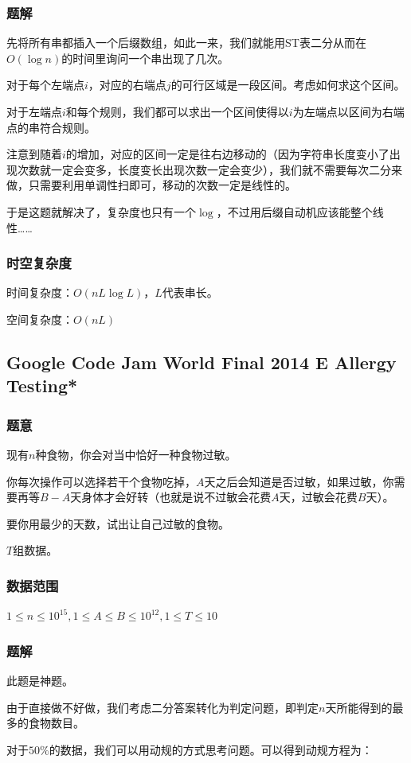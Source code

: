 \documentclass{ctexart}
\begin{document}
\subsubsection{题解}
先将所有串都插入一个后缀数组，如此一来，我们就能用ST表二分从而在$O(\log n)$的时间里询问一个串出现了几次。

对于每个左端点$i$，对应的右端点$j$的可行区域是一段区间。考虑如何求这个区间。

对于左端点$i$和每个规则，我们都可以求出一个区间使得以$i$为左端点以区间为右端点的串符合规则。

注意到随着$i$的增加，对应的区间一定是往右边移动的（因为字符串长度变小了出现次数就一定会变多，长度变长出现次数一定会变少），我们就不需要每次二分来做，只需要利用单调性扫即可，移动的次数一定是线性的。

于是这题就解决了，复杂度也只有一个$\log$，不过用后缀自动机应该能整个线性……
\subsubsection{时空复杂度}
时间复杂度：$O(nL \log L)$，$L$代表串长。

空间复杂度：$O(nL)$
\subsection{Google Code Jam World Final 2014 E Allergy Testing*}
\subsubsection{题意}
现有$n$种食物，你会对当中恰好一种食物过敏。

你每次操作可以选择若干个食物吃掉，$A$天之后会知道是否过敏，如果过敏，你需要再等$B-A$天身体才会好转（也就是说不过敏会花费$A$天，过敏会花费$B$天）。

要你用最少的天数，试出让自己过敏的食物。

$T$组数据。
\subsubsection{数据范围}
$1\le n \le 10^{15},1 \le A \le B \le 10^{12},1 \le T \le 10$
\subsubsection{题解}
此题是神题。

由于直接做不好做，我们考虑二分答案转化为判定问题，即判定$n$天所能得到的最多的食物数目。

对于$50\%$的数据，我们可以用动规的方式思考问题。可以得到动规方程为：
\end{document}
